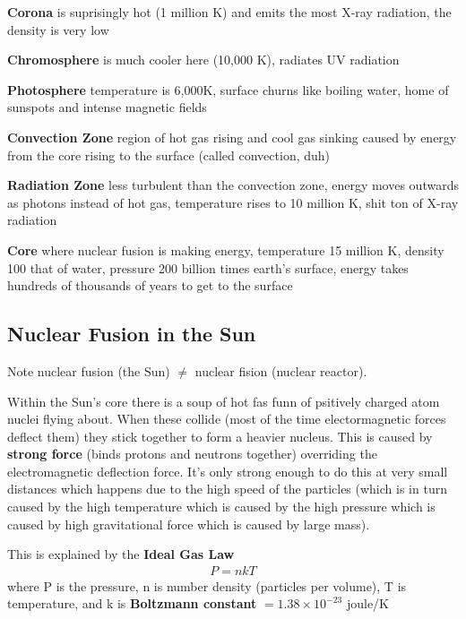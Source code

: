 \documentclass[12pt]{article}
\begin{document}
\textbf{Corona} is suprisingly hot (1 million K) and emits the most X-ray radiation, the density is very low

\textbf{Chromosphere} is much cooler here (10,000 K), radiates UV radiation

\textbf{Photosphere} temperature is 6,000K, surface churns like boiling water, home of sunspots and intense magnetic fields

\textbf{Convection Zone} region of hot gas rising and cool gas sinking caused by energy from the core rising to the surface (called convection, duh)

\textbf{Radiation Zone} less turbulent than the convection zone, energy moves outwards as photons instead of hot gas, temperature rises to 10 million K, shit ton of X-ray radiation

\textbf{Core} where nuclear fusion is making energy, temperature 15 million K, density 100 that of water, pressure 200 billion times earth's surface, energy takes hundreds of thousands of years to get to the surface

\subsection{Nuclear Fusion in the Sun}
Note nuclear fusion (the Sun) $\not =$ nuclear fision (nuclear reactor).

Within the Sun's core there is a soup of hot fas funn of psitively charged atom nuclei flying about. When these collide (most of the time electormagnetic forces deflect them) they stick together to form a heavier nucleus. This is caused by \textbf{strong force} (binds protons and neutrons together) overriding the electromagnetic deflection force. It's only strong enough to do this at very small distances which happens due to the high speed of the particles (which is in turn caused by the high temperature which is caused by the high pressure which is caused by high gravitational force which is caused by large mass).

This is explained by the \textbf{Ideal Gas Law}
\begin{align*}
    P = nkT
\end{align*}
where P is the pressure, n is number density (particles per volume), T is temperature, and k is \textbf{Boltzmann constant} $=1.38 \times 10^{-23}$ joule/K
\end{document}
